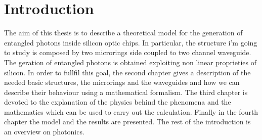 \documentclass[10pt]{book}
\begin{document}

\tableofcontents
\chapter{Introduction}
The aim of this thesis is to describe a theoretical model for the generation of entangled photons inside silicon optic chips. In particular, the structure i'm going to study is composed by two microrings side coupled to two channel waveguide. The geration of entangled photons is obtained exploiting non linear proprieties of silicon. In order to fullfil this goal, the second chapter gives a description of the needed basic structures, the microrings and the waveguides and how we can describe their behaviour using a mathematical formalism. The third chapter is devoted to the explanation of the physics behind the phenomena and the mathematics which can be used to carry out the calculation. Finally in the fourth chapter the model and the results are presented. The rest of the introduction is an overview on photonics. 
\end{document}
